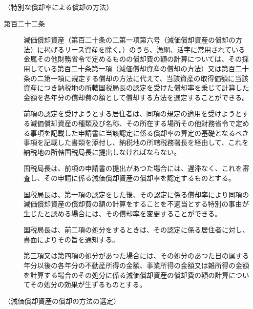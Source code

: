 \documentclass[twocolumn,a4j,10pt]{ltjtarticle}
\begin{document}
\noindent\hspace{10pt}（特別な償却率による償却の方法）
\begin{description}
\item[第百二十二条]減価償却資産（第百二十条の二第一項第六号（減価償却資産の償却の方法）に掲げるリース資産を除く。）のうち、漁網、活字に常用されている金属その他財務省令で定めるものの償却費の額の計算については、その採用している第百二十条第一項（減価償却資産の償却の方法）又は第百二十条の二第一項に規定する償却の方法に代えて、当該資産の取得価額に当該資産につき納税地の所轄国税局長の認定を受けた償却率を乗じて計算した金額を各年分の償却費の額として償却する方法を選定することができる。
\item[]前項の認定を受けようとする居住者は、同項の規定の適用を受けようとする減価償却資産の種類及び名称、その所在する場所その他財務省令で定める事項を記載した申請書に当該認定に係る償却率の算定の基礎となるべき事項を記載した書類を添付し、納税地の所轄税務署長を経由して、これを納税地の所轄国税局長に提出しなければならない。
\item[]国税局長は、前項の申請書の提出があつた場合には、遅滞なく、これを審査し、その申請に係る減価償却資産の償却率を認定するものとする。
\item[]国税局長は、第一項の認定をした後、その認定に係る償却率により同項の減価償却資産の償却費の額の計算をすることを不適当とする特別の事由が生じたと認める場合には、その償却率を変更することができる。
\item[]国税局長は、前二項の処分をするときは、その認定に係る居住者に対し、書面によりその旨を通知する。
\item[]第三項又は第四項の処分があつた場合には、その処分のあつた日の属する年分以後の各年分の不動産所得の金額、事業所得の金額又は雑所得の金額を計算する場合のその処分に係る減価償却資産の償却費の額の計算についてその処分の効果が生ずるものとする。
\end{description}
\noindent\hspace{10pt}（減価償却資産の償却の方法の選定）
\end{document}
